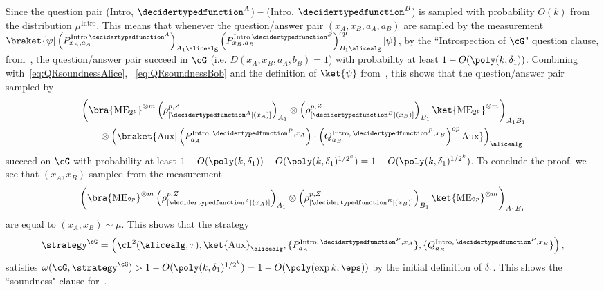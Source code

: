 Since the question pair (Intro, $\decidertypedfunction^A$) \textbf{--} (Intro, $\decidertypedfunction^B$) is sampled with probability $O(k)$ from the distribution $\mu^{\text{Intro}}$. This means that whenever the question/answer pair $(x_A, x_B, a_A,a_B)$ are sampled by the measurement $\braket{\psi|	\left(P^{\text{Intro} \, \decidertypedfunction^A}_{x_A, a_A} \right)_{A_1 \alicealg} 	\left(P^{\text{Intro} \, \decidertypedfunction^B}_{x_B, a_B} \right)_{B_1 \alicealg}^{op}|\psi}$, by the ``Introspection of $\cG$" question clause,  from~, the question/answer pair succeed in $\cG$ (i.e. $D(x_A, x_B, a_A,b_B) =1$) with probability at least $1 - O(\poly(k, \delta_1))$. Combining with~\eqref{eq:QRsoundnessAlice}, ~\eqref{eq:QRsoundnessBob} and the definition of $\ket{\psi}$ from~, this shows that the question/answer pair sampled by
\begin{align*}
	 &\left(\bra{\text{ME}_{2^p}}^{\otimes m}\left(\rho^{p,Z}_{[\decidertypedfunction^A|(x_A) ]}\right)_{A_1} \otimes \left(\rho^{p,Z}_{[\decidertypedfunction^B|(x_B) ]}\right)_{B_1} \ket{\text{ME}_{2^p}}^{\otimes m} \right)_{A_1 B_1} \\
	 &\qquad \otimes \left(\braket{\text{Aux}| \left(P^{\text{Intro}, \, \decidertypedfunction^P, x_A}_{a_A} \right) \cdot \left(Q^{\text{Intro}, \, \decidertypedfunction^P, x_B}_{a_B} \right)^{op} \text{Aux}} \right)_{\alicealg}
\end{align*}
succeed on $\cG$ with probability at least $1 - O(\poly(k, \delta_1)) - O(\poly(k, \delta_1)^{1/2^k}) = 1 - O(\poly(k, \delta_1)^{1/2^k})$. To conclude the proof, we see that $(x_A, x_B)$ sampled from the measurement
\begin{equation*}
	\left(\bra{\text{ME}_{2^p}}^{\otimes m}\left(\rho^{p,Z}_{[\decidertypedfunction^A|(x_A) ]}\right)_{A_1} \otimes \left(\rho^{p,Z}_{[\decidertypedfunction^B|(x_B) ]}\right)_{B_1} \ket{\text{ME}_{2^p}}^{\otimes m} \right)_{A_1 B_1}
\end{equation*}
 are equal to $(x_A,x_B) \sim \mu$. This shows that the strategy
\begin{equation}
	\strategy^{\cG} =  \left(\cL^2(\alicealg,\tau), \ket{\text{Aux}}_{\alicealg}, \{ P^{\text{Intro}, \, \decidertypedfunction^P, x_A}_{a_A} \}, \{Q^{\text{Intro}, \, \decidertypedfunction^P, x_B}_{a_B} \} \right),
\end{equation}
satisfies $\omega(\cG, \strategy^{\cG}) > 1 - O(\poly(k, \delta_1)^{1/2^k}) = 1 - O(\poly(\exp{k}, \eps))  $ by the initial definition of $\delta_1$. This shows the ``soundness" clause for~. 

